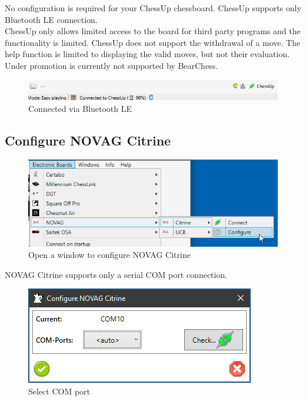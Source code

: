 \documentclass[11pt,a4paper]{article}
\begin{document}
No configuration is required for your ChessUp chessboard. ChessUp supports only Bluetooth LE connection.\\ 
ChessUp only allows limited access to the board for third party programs and the functionality is limited. ChessUp does not support the withdrawal of a move. The help function is limited to displaying the valid moves, but not their evaluation. Under promotion is currently not supported by BearChess.\\

\begin{figure}[H]
	\centering
	\includegraphics[scale=0.7]{ChessUp2.png}
	\caption{Connected via Bluetooth LE}
	\label{fig:ChessUp2}
\end{figure}



\subsection{Configure NOVAG Citrine} \label{ConfigureNovagCitrine}

\begin{figure}[H]
	\centering
	\includegraphics[scale=0.8]{NovagCitrine1.png}
	\caption{Open a window to configure NOVAG Citrine }
	\label{fig:NovagCtrine1}
\end{figure}

NOVAG Citrine supports only a serial COM port connection.

\begin{figure}[H]
	\centering
	\includegraphics[scale=1.0]{NovagCitrine2.png}
	\caption{Select COM port}
	\label{fig:NovagCtrine2}
\end{figure}
\end{document}
